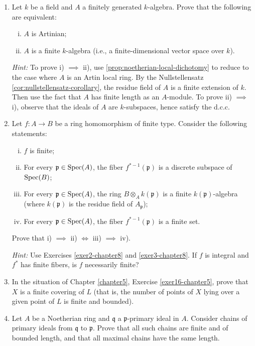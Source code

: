 \begin{enumerate}
    \item \label{exer3-chapter8}Let $k$ be a field and $A$ a finitely generated $k$-algebra. Prove that the following are equivalent:
    \begin{enumerate}[i)]
        \item $A$ is Artinian;
        \item $A$ is a finite $k$-algebra (i.e., a finite-dimensional vector space over $k$).
    \end{enumerate}
    \textit{Hint:} To prove i) $\implies$ ii), use \eqref{prop:noetherian-local-dichotomy} to reduce to the case where $A$ is an Artin local ring. By the Nullstellensatz \eqref{cor:nullstellensatz-corollary}, the residue field of $A$ is a finite extension of $k$. Then use the fact that $A$ has finite length as an $A$-module. To prove ii) $\implies$ i), observe that the ideals of $A$ are $k$-subspaces, hence satisfy the d.c.c.

    \item \label{exer4-chapter8}Let $f \colon A \to B$ be a ring homomorphism of finite type. Consider the following statements:
    \begin{enumerate}[i)]
        \item $f$ is finite;
        \item For every $\mathfrak{p} \in \operatorname{Spec}(A)$, the fiber $f^{*-1}(\mathfrak{p})$ is a discrete subspace of $\operatorname{Spec}(B)$;
        \item For every $\mathfrak{p} \in \operatorname{Spec}(A)$, the ring $B \otimes_A k(\mathfrak{p})$ is a finite $k(\mathfrak{p})$-algebra (where $k(\mathfrak{p})$ is the residue field of $A_{\mathfrak{p}}$);
        \item For every $\mathfrak{p} \in \operatorname{Spec}(A)$, the fiber $f^{*-1}(\mathfrak{p})$ is a finite set.
    \end{enumerate}
    Prove that i) $\implies$ ii) $\iff$ iii) $\implies$ iv).

    \textit{Hint:} Use Exercises \ref{exer2-chapter8} and \ref{exer3-chapter8}.
    If $f$ is integral and $f^*$ has finite fibers, is $f$ necessarily finite?

    \item \label{exer5-chapter8}In the situation of Chapter \ref{chapter5}, Exercise \ref{exer16-chapter5}, prove that $X$ is a finite covering of $L$ (that is, the number of points of $X$ lying over a given point of $L$ is finite and bounded).

    \item \label{exer6-chapter8}Let $A$ be a Noetherian ring and $\mathfrak{q}$ a $\mathfrak{p}$-primary ideal in $A$. Consider chains of primary ideals from $\mathfrak{q}$ to $\mathfrak{p}$. Prove that all such chains are finite and of bounded length, and that all maximal chains have the same length.
\end{enumerate}
